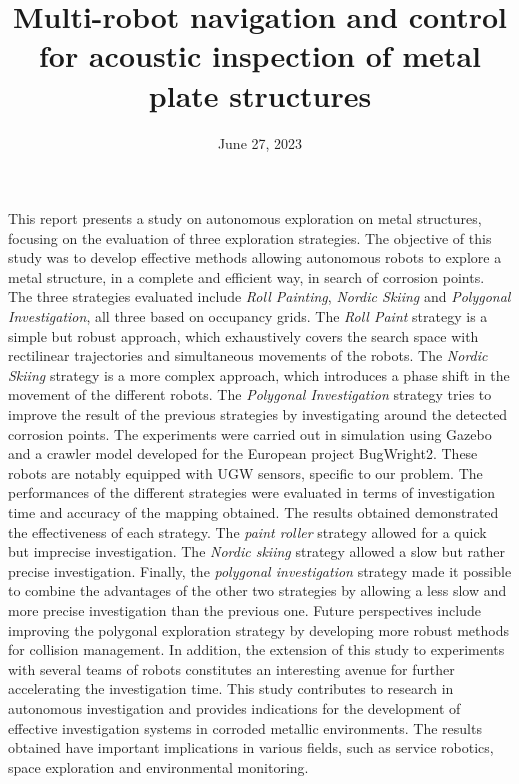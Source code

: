 \documentclass[english,RandD]{rapportPFE}  %
\title{Multi-robot navigation and control for acoustic inspection of metal plate structures}
\date{June 27, 2023}
\begin{document}
	\maketitle
	\begin{ResumeMotsCles}
		\begin{resumeEn}
			{\scriptsize
				This report presents a study on autonomous exploration on metal structures, focusing on the evaluation of three exploration strategies.
				The objective of this study was to develop effective methods allowing autonomous robots to explore a metal structure, in a complete and efficient way, in search of corrosion points.
				The three strategies evaluated include \textit{Roll Painting}, \textit{Nordic Skiing} and \textit{Polygonal Investigation}, all three based on occupancy grids.
				The \textit{Roll Paint} strategy is a simple but robust approach, which exhaustively covers the search space with rectilinear trajectories and simultaneous movements of the robots.
				The \textit{Nordic Skiing} strategy is a more complex approach, which introduces a phase shift in the movement of the different robots.
				The \textit{Polygonal Investigation} strategy tries to improve the result of the previous strategies by investigating around the detected corrosion points.
				The experiments were carried out in simulation using Gazebo and a crawler model developed for the European project BugWright2.
				These robots are notably equipped with UGW sensors, specific to our problem.
				The performances of the different strategies were evaluated in terms of investigation time and accuracy of the mapping obtained.
				The results obtained demonstrated the effectiveness of each strategy.
				The \textit{paint roller} strategy allowed for a quick but imprecise investigation.
				The \textit{Nordic skiing} strategy allowed a slow but rather precise investigation.
				Finally, the \textit{polygonal investigation} strategy made it possible to combine the advantages of the other two strategies by allowing a less slow and more precise investigation than the previous one.
				Future perspectives include improving the polygonal exploration strategy by developing more robust methods for collision management.
				In addition, the extension of this study to experiments with several teams of robots constitutes an interesting avenue for further accelerating the investigation time.
				This study contributes to research in autonomous investigation and provides indications for the development of effective investigation systems in corroded metallic environments.
				The results obtained have important implications in various fields, such as service robotics, space exploration and environmental monitoring.
}
\end{resumeEn}
\end{ResumeMotsCles}
\end{document}
